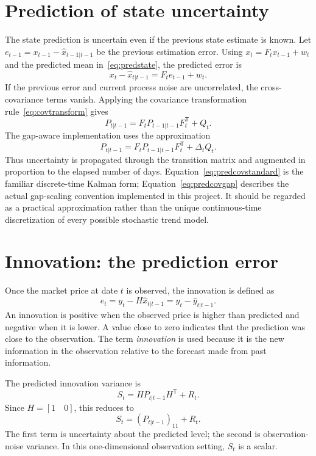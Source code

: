 \documentclass[12pt,a4paper,oneside]{report}
\numberwithin{equation}{chapter}
\numberwithin{figure}{chapter}
\numberwithin{table}{chapter}
\theoremstyle{definition}
\theoremstyle{plain}
\newcommand{\1}{\mathbf{1}}
\newcommand{\trans}{^{\mathsf T}}
\newcommand{\hatt}[1]{\widehat{#1}}
\begin{document}
\section{Prediction of state uncertainty}
The state prediction is uncertain even if the previous state estimate is known. Let $e_{t-1}=x_{t-1}-\hatt{x}_{t-1|t-1}$ be the previous estimation error. Using $x_t=F_tx_{t-1}+w_t$ and the predicted mean in~\eqref{eq:predstate}, the predicted error is
\[
  x_t-\hatt{x}_{t|t-1}=F_te_{t-1}+w_t.
\]
If the previous error and current process noise are uncorrelated, the cross-covariance terms vanish. Applying the covariance transformation rule~\eqref{eq:covtransform} gives
\begin{equation}
  P_{t|t-1}=F_tP_{t-1|t-1}F_t\trans+Q_t.
  \label{eq:predcovstandard}
\end{equation}
The gap-aware implementation uses the approximation
\begin{equation}
  P_{t|t-1}=F_tP_{t-1|t-1}F_t\trans+\Delta_tQ_t.
  \label{eq:predcovgap}
\end{equation}
Thus uncertainty is propagated through the transition matrix and augmented in proportion to the elapsed number of days. Equation~\eqref{eq:predcovstandard} is the familiar discrete-time Kalman form; Equation~\eqref{eq:predcovgap} describes the actual gap-scaling convention implemented in this project. It should be regarded as a practical approximation rather than the unique continuous-time discretization of every possible stochastic trend model.

\section{Innovation: the prediction error}
Once the market price at date $t$ is observed, the innovation is defined as
\begin{equation}
  e_t=y_t-H\hatt{x}_{t|t-1}=y_t-\hatt{y}_{t|t-1}.
  \label{eq:innovation}
\end{equation}
An innovation is positive when the observed price is higher than predicted and negative when it is lower. A value close to zero indicates that the prediction was close to the observation. The term \emph{innovation} is used because it is the new information in the observation relative to the forecast made from past information.

The predicted innovation variance is
\begin{equation}
  S_t=HP_{t|t-1}H\trans+R_t.
  \label{eq:S}
\end{equation}
Since $H=[1\quad 0]$, this reduces to
\begin{equation}
  S_t=(P_{t|t-1})_{11}+R_t.
  \label{eq:Sscalar}
\end{equation}
The first term is uncertainty about the predicted level; the second is observation-noise variance. In this one-dimensional observation setting, $S_t$ is a scalar.
\end{document}
